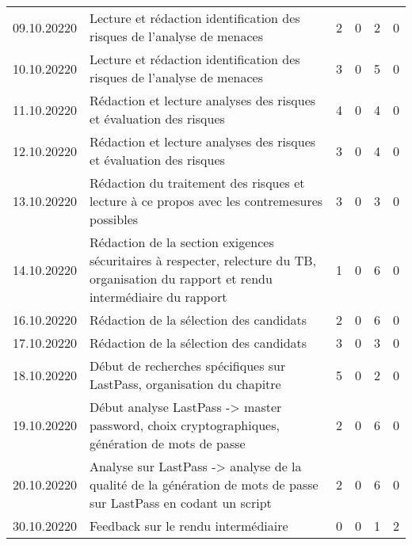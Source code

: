 \begin{landscape}
\begin{longtable}[c]{lp{10cm}rrrr}
	09.10.20220 
	& Lecture et rédaction identification des risques de l'analyse de menaces
	& 2 %
	& 0 %
	& 2 %
	& 0\\ %
	
	10.10.20220 
	& Lecture et rédaction identification des risques de l'analyse de menaces
	& 3 %
	& 0 %
	& 5 %
	& 0\\ %
	
	11.10.20220 
	& Rédaction et lecture analyses des risques et évaluation des risques
	& 4 %
	& 0 %
	& 4 %
	& 0\\ %
	
	12.10.20220 
	& Rédaction et lecture analyses des risques et évaluation des risques
	& 3 %
	& 0 %
	& 4 %
	& 0\\ %
	
	13.10.20220 
	& Rédaction du traitement des risques et lecture à ce propos avec les contremesures possibles
	& 3 %
	& 0 %
	& 3 %
	& 0\\ %
	
	14.10.20220 
	& Rédaction de la section exigences sécuritaires à respecter, relecture du TB, organisation du rapport et rendu intermédiaire du rapport
	& 1 %
	& 0 %
	& 6 %
	& 0\\ %

	16.10.20220
	& Rédaction de la sélection des candidats
	& 2 %
	& 0 %
	& 6 %
	& 0\\ %
	
		17.10.20220
	& Rédaction de la sélection des candidats
	& 3 %
	& 0 %
	& 3 %
	& 0\\ %
	
		18.10.20220
	& Début de recherches spécifiques sur LastPass, organisation du chapitre
	& 5 %
	& 0 %
	& 2 %
	& 0\\ %
	
		19.10.20220
	& Début analyse LastPass -> master password, choix cryptographiques, génération de mots de passe
	& 2 %
	& 0 %
	& 6 %
	& 0\\ %
	
		20.10.20220
	& Analyse sur LastPass -> analyse de la qualité de la génération de mots de passe sur LastPass en codant un script 
	& 2 %
	& 0 %
	& 6 %
	& 0\\ %
	
		30.10.20220
	& Feedback sur le rendu intermédiaire
	& 0 %
	& 0 %
	& 1 %
	& 2\\ %
	

\end{longtable}
\end{landscape}
